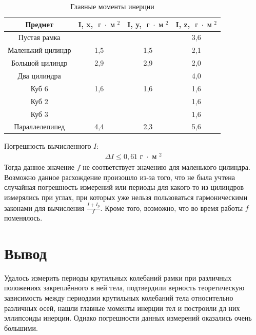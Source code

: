 \begin{table}[!ht]
   \centering
   \caption{Главные моменты инерции}
   \begin{tabular}{|c|c|c|c|}
   \hline
       Предмет & I, x, $\text{ г } \cdot \text{ м }^2$ & I, y, $\text{ г } \cdot \text{ м }^2$ & I, z, $\text{ г } \cdot \text{ м }^2$ \\ \hline
       Пустая рамка & ~ & ~ &  3,6  \\ \hline
       Маленький цилиндр &  1,5  &  1,5  &  2,1  \\ \hline
       Большой цилиндр &  2,9  &  2,9  &  2,0  \\ \hline
       Два цилиндра & ~ & ~ &  4,0  \\ \hline
       Куб 6 &  1,6  &  1,6  &  1,6  \\ \hline
       Куб 2 & ~ & ~ &  1,6  \\ \hline
       Куб 3 & ~ & ~ &  1,6  \\ \hline
       Параллелепипед &  4,4  &  2,3  &  5,6 \\ \hline
   \end{tabular}
\end{table}
Погрешность вычисленного $ I $: \begin{gather}
   \Delta I \leq 0,61 \text{ г } \cdot \text{ м }^2
\end{gather}
Тогда данное значение $ f $ не соответствует значению для маленького цилиндра. Возможно данное расхождение произошло из-за того, что 
не была учтена случайная погрешность измерений или периоды для какого-то из цилиндров измерялись при углах, при которых уже нельзя пользоваться гармоническими законами для
вычисления $ \frac{I + I_p}{f}  $. Кроме того, возможно, что во время работы $ f $ поменялось.
\section{Вывод}
Удалось измерить периоды крутильных колебаний рамки при различных положениях закреплённого в ней тела, подтвердили верность теоретическую зависимость между периодами крутильных колебаний тела относительно различных осей, нашли главные моменты инерции тел и построили дл них эллипсоиды инерции. Однако погрешности данных измерений оказались очень большими.


